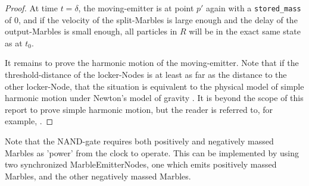 \begin{proof}
    At time $t = \delta$, the moving-emitter is at point $p'$ again with a \texttt{stored\_mass} of 0, and if the velocity of the split-Marbles is large enough and the delay of the output-Marbles is small enough, all particles in $R$ will be in the exact same state as at $t_0$.
    
    It remains to prove the harmonic motion of the moving-emitter. Note that if the threshold-distance of the locker-Nodes is at least as far as the distance to the other locker-Node, that the situation is equivalent to the physical model of simple harmonic motion under Newton's model of gravity \cite{principia}. It is beyond the scope of this report to prove simple harmonic motion, but the reader is referred to, for example, \cite{uni_physics}.
\end{proof}
Note that the NAND-gate requires both positively and negatively massed Marbles as 'power' from the clock to operate. This can be implemented by using two synchronized MarbleEmitterNodes, one which emits positively massed Marbles, and the other negatively massed Marbles.

